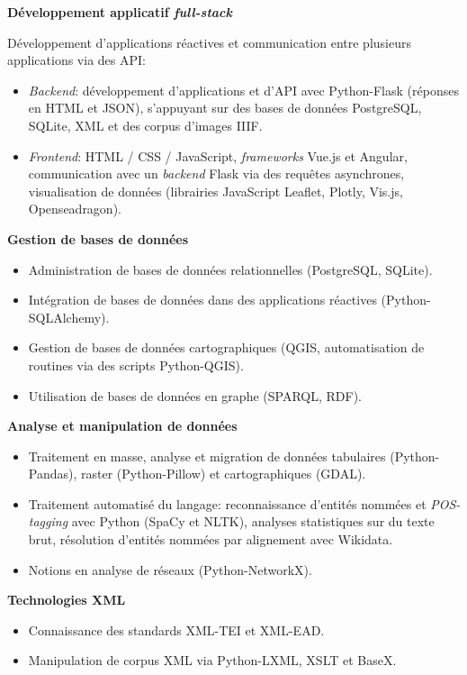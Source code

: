 \datedsubsection{ }
{}
{%
	\textbf{Développement applicatif \textit{full-stack}}}
{%
	Développement d'applications réactives et communication entre plusieurs applications via des API: 
	\begin{itemize}
		\item \textit{Backend}: développement d'applications et d'API avec Python-Flask (réponses en HTML et JSON), s'appuyant sur des bases de données PostgreSQL, SQLite, XML et des corpus d'images IIIF.
		\item \textit{Frontend}: HTML / CSS / JavaScript, \textit{frameworks} Vue.js et Angular, communication avec un \textit{backend} Flask via des requêtes asynchrones, visualisation de données (librairies JavaScript Leaflet, Plotly, Vis.js, Openseadragon).
	\end{itemize}
}

\datedsubsection{ }
{}
{%
	\textbf{Gestion de bases de données}}
{%
	\begin{itemize}
		\item Administration de bases de données relationnelles (PostgreSQL, SQLite).
		\item Intégration de bases de données dans des applications réactives (Python-SQLAlchemy).
		\item Gestion de bases de données cartographiques (QGIS, automatisation de routines via des scripts Python-QGIS).
		\item Utilisation de bases de données en graphe (SPARQL, RDF).
	\end{itemize}
}

\datedsubsection{ }
{}
{%
	\textbf{Analyse et manipulation de données}}
{%
	\begin{itemize}
		\item Traitement en masse, analyse et migration de données tabulaires (Python-Pandas), raster (Python-Pillow) et cartographiques (GDAL).
		\item Traitement automatisé du langage: reconnaissance d'entités nommées et \textit{POS-tagging} avec Python (SpaCy et NLTK), analyses statistiques sur du texte brut, résolution d'entités nommées par alignement avec Wikidata.
		\item Notions en analyse de réseaux (Python-NetworkX).
	\end{itemize}
}

\datedsubsection{ }
{}
{%
	\textbf{Technologies XML}}
{%
	\begin{itemize}
		\item Connaissance des standards XML-TEI et XML-EAD.
		\item Manipulation de corpus XML via Python-LXML, XSLT et BaseX.
	\end{itemize}
}

